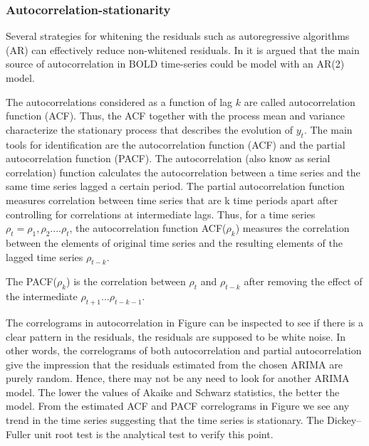 \documentclass[10pt,letterpaper]{article}
\begin{document}

\subsubsection*{Autocorrelation-stationarity}

Several strategies for whitening the residuals such as autoregressive algorithms (AR) can effectively reduce non-whitened residuals. In \cite{monti2011statistical} it is argued that the main source of autocorrelation in BOLD time-series could be model with an AR(2) model.

The autocorrelations considered as a function of lag $k$ are called autocorrelation function (ACF). Thus, the ACF together with the process mean and variance characterize the stationary process that describes the evolution of $y_t$. 
The main tools for identification are the autocorrelation function (ACF) and the partial autocorrelation function (PACF).
The autocorrelation (also know as serial correlation) function calculates the autocorrelation between a time series and the same time series lagged a certain period.
The partial autocorrelation function measures correlation between time series that are k time periods apart after controlling for correlations at intermediate lags. Thus, for a time series $\rho_t = \rho_1, \rho_2 ....\rho_t$, the autocorrelation function ACF($\rho_k$) measures the correlation between the elements of original time series and the resulting elements of the lagged time series $\rho_{t-k}$. 

The PACF($\rho_k$) is the correlation between $\rho_t$ and $\rho_{t-k}$ after removing the effect of the intermediate $\rho_{t+1} ...\rho_{t-k-1}$.

The correlograms in autocorrelation in Figure can be inspected to see if there is a clear pattern in the residuals, the residuals are supposed to be white noise. In other words, the correlograms of both autocorrelation and partial autocorrelation give the impression that the residuals estimated from the chosen ARIMA are purely random. Hence, there may not be any need to look for another ARIMA model.
The lower the values of Akaike and Schwarz statistics, the better the model.
From the estimated ACF and PACF correlograms in Figure we see any trend in the time series suggesting that the time series is stationary. The Dickey–Fuller unit root test is the analytical test to verify this point.
\end{document}

